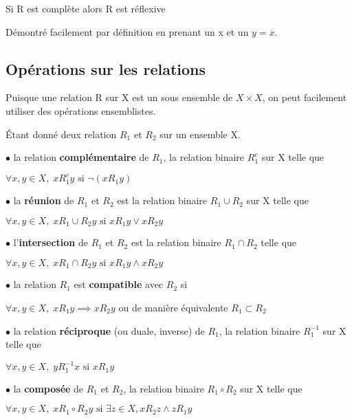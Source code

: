 \documentclass[a4paper, 12pt]{article}
\begin{document}
\begin{proposition}
    Si R est complète alors R est réflexive 
\end{proposition}
Démontré facilement par définition en prenant un x et un $y = x$.




\subsection{Opérations sur les relations}

Puisque une relation R sur X est un sous ensemble de $X \times X$, on peut facilement utiliser
des opérations ensemblistes.

\begin{definition}
    Étant donné deux relation $R_1$ et $R_2$ sur un ensemble X.

    \item $\bullet$ la relation \textbf{complémentaire} de $R_1$, la relation binaire $R_1^c$ sur X telle que
    
    $\forall x, y \in X, \; x R_1^c y \text{ si } \neg(x R_1 y)$
    \item $\bullet$ la \textbf{réunion} de $R_1$ et $R_2$ est la relation binaire $R_1 \cup R_2$ sur X telle que
    
    $\forall x, y \in X, \; x R_1 \cup R_2 y \text{ si } x R_1 y \lor x R_2 y$
    \item $\bullet$ l'\textbf{intersection} de $R_1$ et $R_2$ est la relation binaire $R_1 \cap R_2$ telle que
    
    $\forall x, y \in X, \; x R_1 \cap R_2 y \text{ si } x R_1 y \land x R_2 y$
    \item $\bullet$ la relation $R_1$ est \textbf{compatible} avec $R_2$ si
    
    $\forall x, y \in X, \; x R_1 y \implies x R_2 y$ ou de manière équivalente $R_1 \subset R_2$
    \item $\bullet$ la relation \textbf{réciproque} (ou duale, inverse) de $R_1$,
    la relation binaire $R_1^{-1}$ sur X telle que
    
    $\forall x, y \in X, \; y R_1^{-1} x \text{ si } x R_1 y$
    \item $\bullet$ la \textbf{composée} de $R_1$ et $R_2$,
    la relation binaire $R_1 \circ R_2$ sur X telle que

    $\forall x, y \in X, \; x R_1 \circ R_2 y \text{ si }\exists z \in X, x R_2 z \land z R_1 y$
\end{definition}
\end{document}
